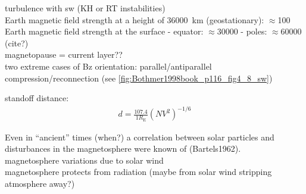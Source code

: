 turbulence with sw (KH or RT instabilities)\\

Earth magnetic field strength at a height of \SI{36000}{\km} (geostationary): $\approx$\SI{100}{\nT}\\
Earth magnetic field strength at the surface - equator: $\approx$\SI{30000}{\nT} - poles: $\approx$\SI{60000}{\nT} (cite?)\\

magnetopause = current layer??\\

two extreme cases of Bz orientation: parallel/antiparallel\\
compression/reconnection (see \autoref{fig:Bothmer1998book_p116_fig4_8_sw})\\
\begin{figure}[htb]
\end{figure}

standoff distance:	\citep[p.~112]{Bothmer2007}
\begin{align}
	d = \frac{107.4}{1 R_\text{E}} (N V^2)^{-1/6}
\end{align}

Even in ``ancient'' times (when?) a correlation between solar particles and disturbances in the magnetosphere were known of (Bartels1962).\\

magnetosphere variations due to solar wind\\
magnetosphere protects from radiation (maybe from solar wind stripping atmosphere away?)\\

